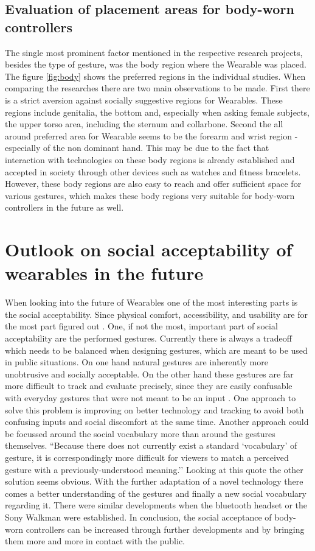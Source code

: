 \documentclass{sigchi}
\begin{document}
\subsection{Evaluation of placement areas for body-worn controllers }
The single most prominent factor mentioned in the respective research projects, besides the type of gesture, was the body region where the Wearable was placed. The figure \ref{fig:body} shows the preferred regions in the individual studies. When comparing the researches there are two main observations to be made. First there is a strict aversion against socially suggestive regions for Wearables. These regions include genitalia, the bottom and, especially when asking female subjects, the upper torso area, including the sternum and collarbone.
Second the all around preferred area for Wearable seems to be the forearm and wrist region - especially of the non dominant hand. \cite{touch-wrist,pinstripe,social-comfort,belt} %
This may be due to the fact that interaction with technologies on these body regions is already established and accepted in society through other devices such as watches and fitness bracelets. However, these body regions are also easy to reach and offer sufficient space for various gestures, which makes these body regions very suitable for body-worn controllers in the future as well.
\section{Outlook on social acceptability of wearables in the future}
When looking into the future of Wearables one of the most interesting parts is the social acceptability. Since physical comfort, accessibility, and usability are for the most part figured out \cite{social-comfort}.
One, if not the most, important part of social acceptability are the performed gestures. Currently there is always a tradeoff which needs to be balanced when designing gestures, which are meant to be used in public situations. On one hand natural gestures are inherently more unobtrusive and socially acceptable. On the other hand these gestures are far more difficult to track and evaluate precisely, since they are easily confusable with everyday gestures that were not meant to be an input \cite{social-comfort}.
One approach to solve this problem is improving on better technology and tracking to avoid both confusing inputs and social discomfort at the same time. Another approach could be focussed around the social vocabulary more than around the gestures themselves.
``Because there does not currently exist a standard `vocabulary’ of gesture, it is correspondingly more difficult for viewers to match a perceived gesture with a previously-understood meaning.'' \cite[p. 4160]{social-comfort} %
Looking at this quote the other solution seems obvious. With the further adaptation of a novel technology there comes a better understanding of the gestures and finally a new social vocabulary regarding it. There were similar developments when the bluetooth headset \cite{social-comfort} or the Sony Walkman \cite{touch-wrist} were established.
In conclusion, the social acceptance of body-worn controllers can be increased through further developments and by bringing them more and more in contact with the public.

% 


\end{document}
